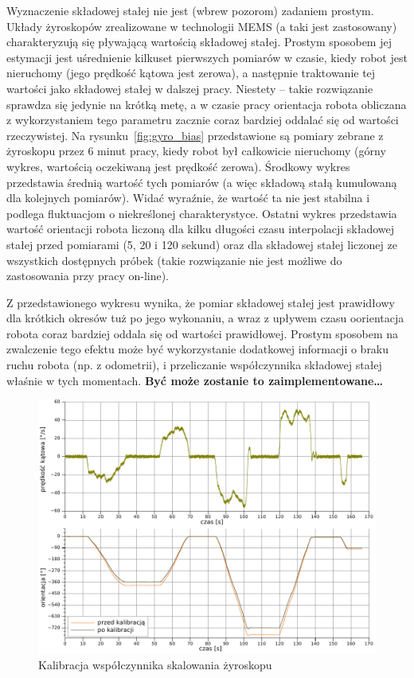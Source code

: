 Wyznaczenie składowej stałej nie jest (wbrew pozorom) zadaniem prostym. Układy
żyroskopów zrealizowane w technologii MEMS (a taki jest zastosowany)
charakteryzują się pływającą wartością składowej stałej. Prostym sposobem jej
estymacji jest uśrednienie kilkuset pierwszych pomiarów w czasie, kiedy
robot jest nieruchomy (jego prędkość kątowa jest zerowa), a następnie
traktowanie tej wartości jako składowej stałej w dalszej pracy. Niestety --
takie rozwiązanie sprawdza się jedynie na krótką metę, a w czasie pracy
orientacja robota obliczana z wykorzystaniem tego parametru zacznie coraz
bardziej oddalać się od wartości rzeczywistej. Na rysunku~\ref{fig:gyro_bias}
przedstawione są pomiary zebrane z żyroskopu przez 6 minut pracy, kiedy robot
był całkowicie nieruchomy (górny wykres, wartością oczekiwaną jest prędkość
zerowa). Środkowy wykres przedstawia średnią wartość tych pomiarów (a więc
składową stałą kumulowaną dla kolejnych pomiarów). Widać wyraźnie, że wartość ta
nie jest stabilna i podlega fluktuacjom o niekreślonej charakterystyce. Ostatni
wykres przedstawia wartość orientacji robota liczoną dla kilku długości czasu
interpolacji składowej stałej przed pomiarami (5, 20 i 120 sekund) oraz dla
składowej stałej liczonej ze wszystkich dostępnych próbek (takie rozwiązanie
nie jest możliwe do zastosowania przy pracy on-line). 

Z przedstawionego wykresu wynika, że pomiar składowej stałej jest prawidłowy dla
krótkich okresów tuż po jego wykonaniu, a wraz z upływem czasu oorientacja
robota coraz bardziej oddala się od wartości prawidłowej. Prostym sposobem na
zwalczenie tego efektu może być wykorzystanie dodatkowej informacji o braku
ruchu robota (np. z odometrii), i przeliczanie współczynnika składowej stałej
właśnie w tych momentach.  \textbf{\Large Być może zostanie to
zaimplementowane\ldots}

\begin{figure}[ht!]
\centering
\includegraphics[width=\textwidth]{../../Common/pomiary/gyro_rot}
\caption{Kalibracja współczynnika skalowania żyroskopu}
\label{fig:gyro_rot}
\end{figure}

